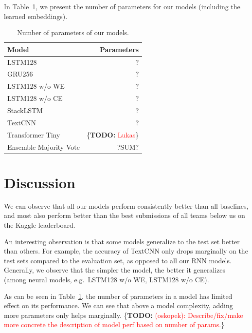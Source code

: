 \documentclass[10pt,conference,compsocconf]{IEEEtran}
\newcommand{\TODO}[1]{\{\textbf{TODO: }\textcolor{red}{#1}\}}
\begin{document}
In Table~\ref{tab:params}, we present the number of parameters for our models (including the learned embeddings).

\begin{table}\centering
\begin{tabular}{lr}
\toprule
Model & Parameters\\
\midrule
LSTM128 & ?\\
GRU256 & ?\\
LSTM128 w/o WE & ?\\
LSTM128 w/o CE & ?\\
StackLSTM & ?\\
TextCNN & ?\\
Transformer Tiny & \TODO{Lukas}\\
Ensemble Majority Vote & ?SUM?\\
\bottomrule
\end{tabular}
\caption{Number of parameters of our models.}\label{tab:params}
\end{table}

\section{Discussion}

We can observe that all our models perform consistently better than all baselines, and most also perform better than the best submissions of all teams below us on the Kaggle leaderboard.

An interesting observation is that some models generalize to the test set better than others. For example, the accuracy of TextCNN only drops marginally on the test sets compared to the evaluation set, as opposed to all our RNN models. Generally, we observe that the simpler the model, the better it generalizes (among neural models, e.g.~LSTM128 w/o WE, LSTM128 w/o CE).

As can be seen in Table~\ref{tab:params},
the number of parameters in a model has limited effect on its performance. We can see that above a model complexity, adding more parameters only helps marginally.
\TODO{(oskopek): Describe/fix/make more concrete the description of model perf based on number of params.}
\end{document}
